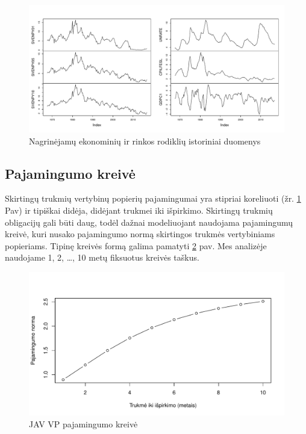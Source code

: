 \documentclass[12pt,lithuanian,]{article}
\begin{document}
\begin{figure}[htbp]
\centering
\includegraphics{bayesFAVAR_TVP_files/figure-latex/data-1.pdf}
\caption{\label{fig:data}Nagrinėjamų ekonominių ir rinkos rodiklių
istoriniai duomenys}
\end{figure}

\subsection{Pajamingumo kreivė}\label{pajamingumo-kreive}

Skirtingų trukmių vertybinų popierių pajamingumai yra stipriai
koreliuoti (žr. \ref{fig:data} Pav) ir tipiškai didėja, didėjant trukmei
iki išpirkimo. Skirtingų trukmių obligacijų gali būti daug, todėl dažnai
modeliuojant naudojama pajamingumų kreivė, kuri nusako pajamingumo normą
skirtingos trukmės vertybiniams popieriams. Tipinę kreivės formą galima
pamatyti \ref{fig:yc_example} pav. Mes analizėje naudojame 1, 2,
\ldots{}, 10 metų fiksuotus kreivės taškus.

\begin{figure}[htbp]
\centering
\includegraphics{bayesFAVAR_TVP_files/figure-latex/yc_example-1.pdf}
\caption{\label{fig:yc_example}JAV VP pajamingumo kreivė}
\end{figure}
\end{document}
